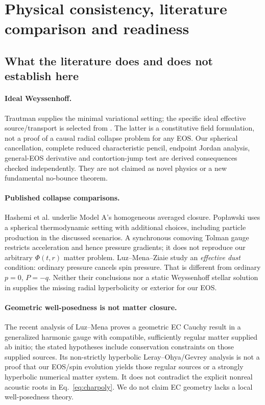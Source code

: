 \section{Physical consistency, literature comparison and readiness}
\subsection{What the literature does and does not establish here}
\paragraph{Ideal Weyssenhoff.} Trautman \cite{Trautman} supplies the minimal variational setting; the specific ideal effective source/transport is selected from \cite{BHL,OK}. The latter is a constitutive field formulation, not a proof of a causal radial collapse problem for any EOS. Our spherical cancellation, complete reduced characteristic pencil, endpoint Jordan analysis, general-EOS derivative and contortion-jump test are derived consequences checked independently. They are not claimed as novel physics or a new fundamental no-bounce theorem.

\paragraph{Published collapse comparisons.} Hashemi et al. \cite{Hashemi} underlie Model A's homogeneous averaged closure. Pop{\l}awski \cite{Pop} uses a spherical thermodynamic setting with additional choices, including particle production in the discussed scenarios. A synchronous comoving Tolman gauge restricts acceleration and hence pressure gradients; it does not reproduce our arbitrary $\Phi(t,r)$ matter problem. Luz--Mena--Ziaie \cite{LMZ} study an \emph{effective dust} condition: ordinary pressure cancels spin pressure. That is different from ordinary $p=0$, $P=-q$. Neither their conclusions nor a static Weyssenhoff stellar solution in \cite{LC} supplies the missing radial hyperbolicity or exterior for our EOS.

\paragraph{Geometric well-posedness is not matter closure.} The recent analysis of Luz--Mena \cite{LWP} proves a geometric EC Cauchy result in a generalized harmonic gauge with compatible, sufficiently regular matter supplied ab initio; the stated hypotheses include conservation constraints on those supplied sources. Its non-strictly hyperbolic Leray--Ohya/Gevrey analysis is not a proof that our EOS/spin evolution yields those regular sources or a strongly hyperbolic numerical matter system. It does not contradict the explicit nonreal acoustic roots in Eq.~\eqref{eq:charpoly}. We do not claim EC geometry lacks a local well-posedness theory.

